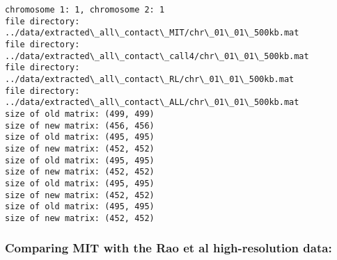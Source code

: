 \documentclass[11pt]{article}
\begin{document}
    \begin{Verbatim}[commandchars=\\\{\}]
chromosome 1: 1, chromosome 2: 1
file directory: ../data/extracted\_all\_contact\_MIT/chr\_01\_01\_500kb.mat
file directory: ../data/extracted\_all\_contact\_call4/chr\_01\_01\_500kb.mat
file directory: ../data/extracted\_all\_contact\_RL/chr\_01\_01\_500kb.mat
file directory: ../data/extracted\_all\_contact\_ALL/chr\_01\_01\_500kb.mat
size of old matrix: (499, 499)
size of new matrix: (456, 456)
size of old matrix: (495, 495)
size of new matrix: (452, 452)
size of old matrix: (495, 495)
size of new matrix: (452, 452)
size of old matrix: (495, 495)
size of new matrix: (452, 452)
size of old matrix: (495, 495)
size of new matrix: (452, 452)

    \end{Verbatim}

    \subsubsection{Comparing MIT with the Rao et al high-resolution
data:}\label{comparing-mit-with-the-rao-et-al-high-resolution-data}
\end{document}
